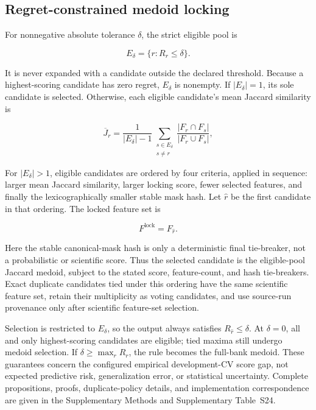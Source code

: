 \subsection{Regret-constrained medoid locking}

For nonnegative absolute tolerance \(\delta\), the strict eligible pool is

\begin{equation}
E_\delta=\{r:R_r\leq\delta\}.
\label{eq:eligible-pool}
\end{equation}

It is never expanded with a candidate outside the declared threshold. Because a highest-scoring candidate has zero regret, \(E_\delta\) is nonempty. If \(|E_\delta|=1\), its sole candidate is selected. Otherwise, each eligible candidate's mean Jaccard similarity is

\begin{equation}
\overline J_r=\frac{1}{|E_\delta|-1}\sum_{\substack{s\in E_\delta\\s\ne r}}
\frac{|F_r\cap F_s|}{|F_r\cup F_s|},
\label{eq:eligible-medoid}
\end{equation}

For \(|E_\delta|>1\), eligible candidates are ordered by four criteria, applied in sequence: larger mean Jaccard similarity, larger locking score, fewer selected features, and finally the lexicographically smaller stable mask hash. Let \(\widehat r\) be the first candidate in that ordering. The locked feature set is

\begin{equation}
F^{\mathrm{lock}}=F_{\widehat r}.
\label{eq:locking-lexicographic}
\end{equation}

Here the stable canonical-mask hash is only a deterministic final tie-breaker, not a probabilistic or scientific score. Thus the selected candidate is the eligible-pool Jaccard medoid, subject to the stated score, feature-count, and hash tie-breakers. Exact duplicate candidates tied under this ordering have the same scientific feature set, retain their multiplicity as voting candidates, and use source-run provenance only after scientific feature-set selection.

Selection is restricted to \(E_\delta\), so the output always satisfies \(R_{\widehat r}\leq\delta\). At \(\delta=0\), all and only highest-scoring candidates are eligible; tied maxima still undergo medoid selection. If \(\delta\geq\max_rR_r\), the rule becomes the full-bank medoid. These guarantees concern the configured empirical development-CV score gap, not expected predictive risk, generalization error, or statistical uncertainty. Complete propositions, proofs, duplicate-policy details, and implementation correspondence are given in the Supplementary Methods and Supplementary Table~S24.

